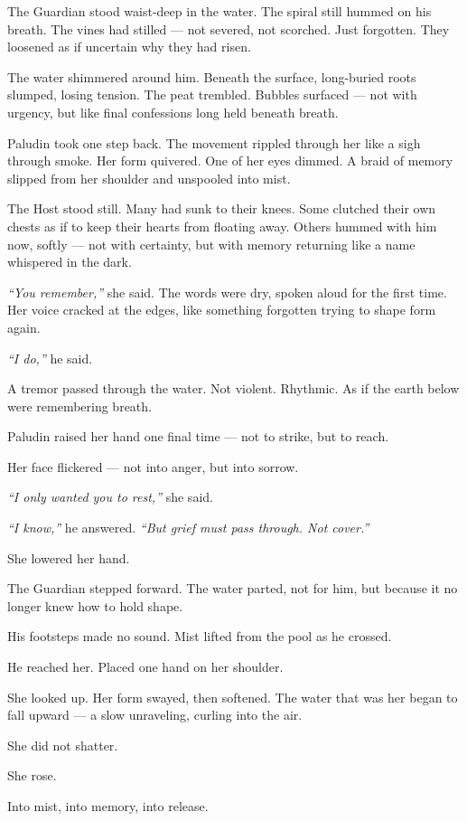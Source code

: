 \documentclass[9pt]{article}
\begin{document}
The Guardian stood waist-deep in the water. The spiral still hummed on his breath. The vines had stilled — not severed, not scorched. Just forgotten. They loosened as if uncertain why they had risen.

The water shimmered around him. Beneath the surface, long-buried roots slumped, losing tension. The peat trembled. Bubbles surfaced — not with urgency, but like final confessions long held beneath breath.

Paludin took one step back. The movement rippled through her like a sigh through smoke. Her form quivered. One of her eyes dimmed. A braid of memory slipped from her shoulder and unspooled into mist.

The Host stood still. Many had sunk to their knees. Some clutched their own chests as if to keep their hearts from floating away. Others hummed with him now, softly — not with certainty, but with memory returning like a name whispered in the dark.

\textit{``You remember,''} she said. The words were dry, spoken aloud for the first time. Her voice cracked at the edges, like something forgotten trying to shape form again.

\textit{``I do,''} he said.

A tremor passed through the water. Not violent. Rhythmic. As if the earth below were remembering breath.

Paludin raised her hand one final time — not to strike, but to reach.

Her face flickered — not into anger, but into sorrow.

\textit{``I only wanted you to rest,''} she said.

\textit{``I know,''} he answered. \textit{``But grief must pass through. Not cover.''}

She lowered her hand.

The Guardian stepped forward. The water parted, not for him, but because it no longer knew how to hold shape.

His footsteps made no sound. Mist lifted from the pool as he crossed.

He reached her. Placed one hand on her shoulder.

She looked up. Her form swayed, then softened. The water that was her began to fall upward — a slow unraveling, curling into the air.

She did not shatter.

She rose.

Into mist, into memory, into release.
\end{document}
